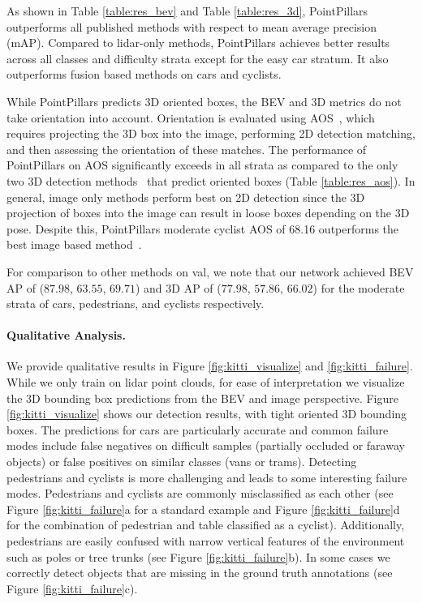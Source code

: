 \documentclass[10pt,twocolumn,letterpaper]{article}
\newcommand{\mypar}[1]{\vspace{-4mm}\paragraph{#1}}
\newcommand{\figref}[1]{Figure \ref{#1}}
\newcommand{\tableref}[1]{Table \ref{#1}}
\newcommand{\squeeze}{\vspace{-0.5mm}}
\begin{document}
As shown in \tableref{table:res_bev} and \tableref{table:res_3d}, PointPillars outperforms all published methods with respect to mean average precision (mAP).
Compared to lidar-only methods, PointPillars achieves better results across all classes and difficulty strata except for the easy car stratum.
It also outperforms fusion based methods on cars and cyclists.

While PointPillars predicts 3D oriented boxes, the BEV and 3D metrics do not take orientation into account.
Orientation is evaluated using AOS~\cite{kitti}, which requires projecting the 3D box into the image, performing 2D detection matching, and then assessing the orientation of these matches.
The performance of PointPillars on AOS significantly exceeds in all strata as compared to the only two 3D detection methods~\cite{avod,second} that predict oriented boxes (\tableref{table:res_aos}).
In general, image only methods perform best on 2D detection since the 3D projection of boxes into the image can result in loose boxes depending on the 3D pose.
Despite this, PointPillars moderate cyclist AOS of 68.16 outperforms the best image based method~\cite{xiang2017subcategory}.

For comparison to other methods on val, we note that our network achieved BEV AP of ($87.98$, $63.55$, $69.71$) and 3D AP of ($77.98$, $57.86$, $66.02$) for the moderate strata of cars, pedestrians, and cyclists respectively.

\squeeze
\mypar{Qualitative Analysis.}
We provide qualitative results in \figref{fig:kitti_visualize} and \ref{fig:kitti_failure}.
While we only train on lidar point clouds, for ease of interpretation we visualize the 3D bounding box predictions from the BEV and image perspective.
\figref{fig:kitti_visualize} shows our detection results, with tight oriented 3D bounding boxes.
The predictions for cars are particularly accurate and common failure modes include false negatives on difficult samples (partially occluded or faraway objects) or false positives on similar classes (vans or trams).
Detecting pedestrians and cyclists is more challenging and leads to some interesting failure modes.
Pedestrians and cyclists are commonly misclassified as each other (see \figref{fig:kitti_failure}a for a standard example and \figref{fig:kitti_failure}d for the combination of pedestrian and table classified as a cyclist).
Additionally, pedestrians are easily confused with narrow vertical features of the environment such as poles or tree trunks (see \figref{fig:kitti_failure}b).
In some cases we correctly detect objects that are missing in the ground truth annotations (see \figref{fig:kitti_failure}c).
\end{document}
